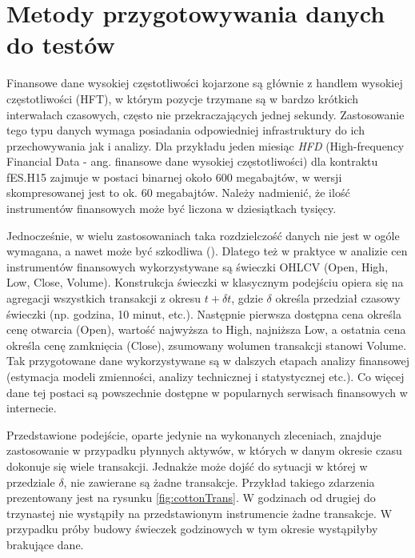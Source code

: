 \documentclass[a4paper,12pt,openany, DIV=calc, headsepline]{scrbook}
\begin{document}
\section{Metody przygotowywania danych do testów}

Finansowe dane wysokiej częstotliwości kojarzone są głównie z handlem wysokiej częstotliwości (HFT), w którym pozycje trzymane są w bardzo krótkich interwałach czasowych, często nie przekraczających jednej sekundy. Zastosowanie tego typu danych wymaga posiadania odpowiedniej infrastruktury do ich przechowywania jak i analizy. Dla przykładu jeden miesiąc \emph{HFD} (High-frequency Financial Data - ang. finansowe dane wysokiej częstotliwości) dla kontraktu fES.H15 zajmuje w postaci binarnej około 600 megabajtów, w wersji skompresowanej jest to ok. 60 megabajtów. Należy nadmienić, że ilość instrumentów finansowych może być liczona w dziesiątkach tysięcy.

Jednocześnie, w wielu zastosowaniach taka rozdzielczość danych nie jest w ogóle wymagana, a nawet może być szkodliwa (\citep{doman2009modelowanie}). Dlatego też w praktyce w analizie cen instrumentów finansowych wykorzystywane są świeczki OHLCV (Open, High, Low, Close, Volume). Konstrukcja świeczki w klasycznym podejściu opiera się na agregacji wszystkich transakcji z okresu $t + \delta t$, gdzie $\delta$ określa przedział czasowy świeczki (np. godzina, 10 minut, etc.). Następnie pierwsza dostępna cena określa cenę otwarcia (Open), wartość najwyższa to High, najniższa Low, a ostatnia cena określa cenę zamknięcia (Close), zsumowany wolumen transakcji stanowi Volume. Tak przygotowane dane wykorzystywane są w dalszych etapach analizy finansowej (estymacja modeli zmienności, analizy technicznej i statystycznej etc.). Co więcej dane tej postaci są powszechnie dostępne w popularnych serwisach finansowych w internecie.

Przedstawione podejście, oparte jedynie na wykonanych zleceniach, znajduje zastosowanie w przypadku płynnych aktywów, w których w danym okresie czasu dokonuje się wiele transakcji. Jednakże może dojść do sytuacji w której w przedziale $\delta$, nie zawierane są żadne transakcje. Przykład takiego zdarzenia prezentowany jest na rysunku \ref{fig:cottonTrans}. W godzinach od drugiej do trzynastej nie wystąpiły na przedstawionym instrumencie żadne transakcje. W przypadku próby budowy świeczek godzinowych w tym okresie wystąpiłyby brakujące dane.
\end{document}
